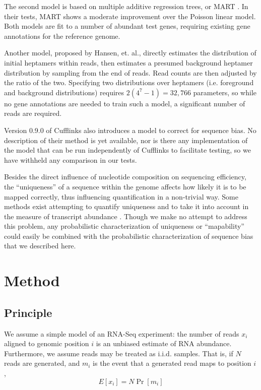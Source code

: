 \documentclass{bioinfo}
\begin{document}
The second model is based on multiple additive regression trees, or MART
\cite{Friedman2003}.  In their tests, MART shows a moderate improvement over the
Poisson linear model. Both models are fit to a number of abundant test genes,
requiring existing gene annotations for the reference genome. 

Another model, proposed by Hansen, et. al., \cite{Hansen2010} directly estimates
the distribution of initial heptamers within reads, then estimates a presumed
background heptamer distribution by sampling from the end of reads. Read counts
are then adjusted by the ratio of the two. Specifying two distributions over
heptamers (i.e. foreground and background distributions) requires $2(4^7-1) =
32,766$ parameters, so while no gene annotations are needed to train such a
model, a significant number of reads are required.

Version 0.9.0 of Cufflinks \cite{Trapnell2010} also introduces a model to
correct for sequence bias. No description of their method is yet available, nor
is there any implementation of the model that can be run independently of
Cufflinks to facilitate testing, so we have withheld any comparison in our
tests.

Besides the direct influence of nucleotide composition on sequencing efficiency,
the ``uniqueness'' of a sequence within the genome affects how likely it is to
be mapped correctly, thus influencing quantification in a non-trivial way. Some
methods exist attempting to quantify uniqueness \cite{Koehler2010} and to take
it into account in the measure of transcript abundance \cite{Li2010b}
\cite{Lee2010}. Though we make no attempt to address this problem, any
probabilistic characterization of uniqueness or ``mapability'' could easily be
combined with the probabilistic characterization of sequence bias that we
described here.


\section{Method}

\subsection{Principle}

We assume a simple model of an RNA-Seq experiment: the number of reads $x_i$
aligned to genomic position $i$ is an unbiased estimate of RNA abundance.
Furthermore, we assume reads may be treated as i.i.d. samples. That
is, if $N$ reads are generated, and $m_i$ is the event that a generated read
maps to position $i$,
$$ E[ x_i ] = N \Pr[ m_i ] $$
\end{document}
